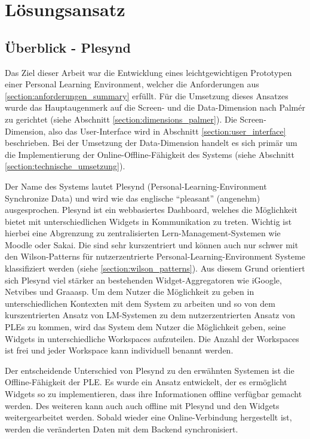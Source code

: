 \chapter{Lösungsansatz} 
\label{Kapitel 5}

\section{Überblick - Plesynd}
Das Ziel dieser Arbeit war die Entwicklung eines leichtgewichtigen Prototypen einer Personal Learning Environment, welcher die Anforderungen aus \ref{section:anforderungen_summary} erfüllt. Für die Umsetzung dieses Ansatzes wurde das Hauptaugenmerk auf die Screen- und die Data-Dimension nach Palmér zu gerichtet (siehe Abschnitt \ref{section:dimensions_palmer}). Die Screen-Dimension, also das User-Interface wird in Abschnitt \ref{section:user_interface} beschrieben. Bei der Umsetzung der Data-Dimension handelt es sich primär um die Implementierung der Online-Offline-Fähigkeit des Systems (siehe Abschnitt \ref{section:technische_umsetzung}).

Der Name des Systems lautet Plesynd (Personal-Learning-Environment Synchronize Data) und wird wie das englische "`pleasant"' (angenehm) ausgesprochen. Plesynd ist ein webbasiertes Dashboard, welches die Möglichkeit bietet mit unterschiedlichen Widgets in Kommunikation zu treten. Wichtig ist hierbei eine Abgrenzung zu zentralisierten Lern-Management-Systemen wie Moodle oder Sakai. Die sind sehr kurszentriert und können auch nur schwer mit den Wilson-Patterns für nutzerzentrierte Personal-Learning-Environment Systeme klassifiziert werden (siehe \ref{section:wilson_patterns}). Aus diesem Grund orientiert sich Plesynd viel stärker an bestehenden Widget-Aggregatoren wie iGoogle, Netvibes und Graaasp. Um dem Nutzer die Möglichkeit zu geben in unterschiedlichen Kontexten mit dem System zu arbeiten und so von dem kurszentrierten Ansatz von LM-Systemen zu dem nutzerzentrierten Ansatz von PLEs zu kommen, wird das System dem Nutzer die Möglichkeit geben, seine Widgets in unterschiedliche Workspaces aufzuteilen. Die Anzahl der Workspaces ist frei und jeder Workspace kann individuell benannt werden.

Der entscheidende Unterschied von Plesynd zu den erwähnten Systemen ist die Offline-Fähigkeit der PLE. Es wurde ein Ansatz entwickelt, der es ermöglicht Widgets so zu implementieren, dass ihre Informationen offline verfügbar gemacht werden. Des weiteren kann auch auch offline mit Plesynd und den Widgets weitergearbeitet werden. Sobald wieder eine Online-Verbindung hergestellt ist, werden die veränderten Daten mit dem Backend synchronisiert.

